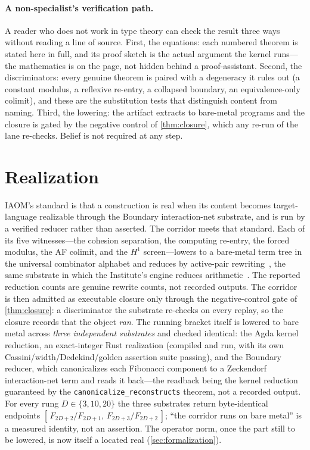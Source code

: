 \documentclass[11pt,letterpaper]{article}
\theoremstyle{plain}
\theoremstyle{definition}
\theoremstyle{remark}
\begin{document}
\paragraph{A non-specialist's verification path.}
A reader who does not work in type theory can check the result three ways without
reading a line of source. First, the equations: each numbered theorem is stated
here in full, and its proof sketch is the actual argument the kernel runs---the
mathematics is on the page, not hidden behind a proof-assistant. Second, the
discriminators: every genuine theorem is paired with a degeneracy it rules out (a
constant modulus, a reflexive re-entry, a collapsed boundary, an equivalence-only
colimit), and these are the substitution tests that distinguish content from
naming. Third, the lowering: the artifact extracts to bare-metal programs and the
closure is gated by the negative control of \cref{thm:closure}, which any
re-run of the lane re-checks. Belief is not required at any step.

\section{Realization}\label{sec:realization}

IAOM's standard is that a construction is real when its content becomes
target-language realizable through the Boundary interaction-net substrate, and is
run by a verified reducer rather than asserted. The corridor meets that standard.
Each of its five witnesses---the cohesion separation, the computing re-entry, the
forced modulus, the AF colimit, and the $H^1$ screen---lowers to a bare-metal term
tree in the universal combinator alphabet and reduces by active-pair
rewriting~\citep{lafont1997interaction}, the same substrate in which the
Institute's engine reduces arithmetic~\citep{iaom_every_number}. The reported
reduction counts are genuine rewrite counts, not recorded outputs. The corridor is
then admitted as executable closure only through the negative-control gate of
\cref{thm:closure}: a discriminator the substrate re-checks on every replay, so
the closure records that the object \emph{ran}. The running bracket itself is lowered
to bare metal across \emph{three independent substrates} and checked identical: the
Agda kernel reduction, an exact-integer Rust realization (compiled and run, with its
own Cassini/width/Dedekind/golden assertion suite passing), and the Boundary reducer,
which canonicalizes each Fibonacci component to a Zeckendorf interaction-net term and
reads it back---the readback being the kernel reduction guaranteed by the
\texttt{canonicalize\_reconstructs} theorem, not a recorded output. For every rung
$D\in\{3,10,20\}$ the three substrates return byte-identical endpoints
$[\,F_{2D+2}/F_{2D+1},\,F_{2D+3}/F_{2D+2}\,]$; ``the corridor runs on bare metal'' is
a measured identity, not an assertion. The operator norm, once the part still to be
lowered, is now itself a located real (\cref{sec:formalization}).
\end{document}

